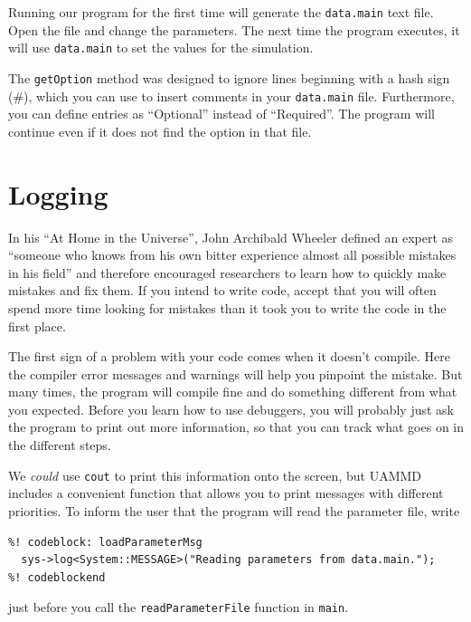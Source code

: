 Running our program for the first time will generate the \texttt{data.main} text
file. Open the file and change the parameters. The next time the program
executes, it will use \texttt{data.main} to set the values for the simulation.

The \texttt{getOption} method was designed to ignore lines beginning with a hash
sign (\#), which you can use to insert comments in your \texttt{data.main} file.
Furthermore, you can define entries as ``Optional'' instead of ``Required''. The
program will continue even if it does not find the option in that file.

\section{Logging}

In his ``At Home in the Universe'', John Archibald Wheeler defined an expert as
``someone who knows from his own bitter experience almost all possible mistakes
in his field'' and therefore encouraged researchers to learn how to quickly make
mistakes and fix them. If you intend to write code, accept that you will often
spend more time looking for mistakes than it took you to write the code in the
first place.

The first sign of a problem with your code comes when it doesn't compile. Here 
the compiler error messages and	warnings will help you pinpoint	the mistake. But 
many times, the program will compile fine and do something different from what 
you expected. Before you learn how to use debuggers, you will probably just ask 
the program to print out more information, so that you can track what goes on in 
the different steps.

We \textit{could} use \texttt{cout} to print this information onto the screen, 
but UAMMD includes a convenient function that allows you to print messages with 
different priorities. To inform the user that the program will read the 
parameter file, write
\begin{lstlisting}
%! codeblock: loadParameterMsg
  sys->log<System::MESSAGE>("Reading parameters from data.main.");
%! codeblockend
\end{lstlisting}
just before you call the \texttt{readParameterFile} function in \texttt{main}.

